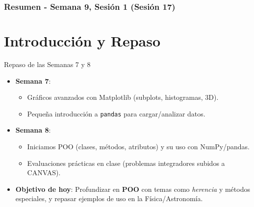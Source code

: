 \documentclass[10pt]{beamer}
\begin{document}
\myfront{}

\begin{frame}
  \titlepage
\end{frame}

\begin{frame}
  \frametitle{Resumen - Semana 9, Sesión 1 (Sesión 17)}
  \tableofcontents
\end{frame}


\section{Introducción y Repaso}

\begin{frame}{Repaso de las Semanas 7 y 8}
  \begin{itemize}
    \item \textbf{Semana 7}:
      \begin{itemize}
        \item Gráficos avanzados con Matplotlib (subplots, histogramas, 3D).
        \item Pequeña introducción a \texttt{pandas} para cargar/analizar datos.
      \end{itemize}
    \item \textbf{Semana 8}:
      \begin{itemize}
        \item Iniciamos POO (clases, métodos, atributos) y su uso con NumPy/pandas.
        \item Evaluaciones prácticas en clase (problemas integradores subidos a CANVAS).
      \end{itemize}
    \item \textbf{Objetivo de hoy}: Profundizar en \textbf{POO} con temas como \textit{herencia} y métodos especiales, y repasar ejemplos de uso en la Física/Astronomía.
  \end{itemize}
\end{frame}
\end{document}

